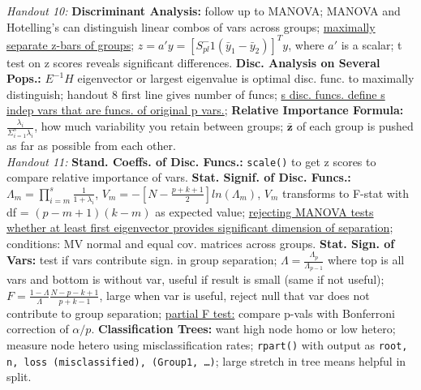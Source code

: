 \documentclass[9pt]{extarticle}
\begin{document}
\textit{Handout 10:}
\textbf{Discriminant Analysis:} follow up to MANOVA; MANOVA and Hotelling's can
distinguish linear combos of vars across groups; \underline{maximally separate 
z-bars of groups}; $z = a'y = [S_{pl}^-1(\bar{y}_1 - \bar{y}_2)]^T y$, where 
$a'$ is a scalar; t test on z scores reveals significant differences.
\textbf{Disc. Analysis on Several Pops.:} $E^{-1}H$ eigenvector or largest 
eigenvalue is optimal disc. func. to maximally distinguish; handout 8 first line 
gives number of funcs; \underline{s disc. funcs. define s indep vars that are 
funcs. of original p vars.}; \textbf{Relative Importance Formula:} $\frac{
\lambda_i}{\Sigma_{i=1}^s \lambda_i}$, how much variability you retain between
groups; $\boldsymbol{\bar{z}}$ of each group is pushed as far as possible from 
each other.\\

\textit{Handout 11:}
\textbf{Stand. Coeffs. of Disc. Funcs.:} \texttt{scale()} to get z scores to 
compare relative importance of vars.
\textbf{Stat. Signif. of Disc. Funcs.:} $\Lambda_m = \prod_{i=m}^s \frac{
1}{1 + \lambda_i}$, $V_m = -[N - \frac{p + k + 1}{2}]ln(\Lambda_m)$, $V_m$ 
transforms to F-stat with df = $(p-m+1)(k-m)$ as expected value; \underline{
rejecting MANOVA tests whether at least first eigenvector provides significant
dimension of separation}; conditions: MV normal and equal cov. matrices across 
groups.
\textbf{Stat. Sign. of Vars:} test if vars contribute sign. in group separation; 
$\Lambda = \frac{\Lambda_p}{\Lambda_{p-1}}$ where top is all vars and bottom is 
without var, useful if result is small (same if not useful); $F = \frac{1 - 
\Lambda}{\Lambda} \frac{N - p - k + 1}{p + k - 1}$, large when var is useful, 
reject null that var does not contribute to group separation; \underline{partial 
F test:} compare p-vals with Bonferroni correction of $\alpha / p$.
\textbf{Classification Trees:} want high node homo or low hetero; measure 
node hetero using misclassification rates; \texttt{rpart()} with output as 
\texttt{root, n, loss (misclassified), (Group1, \dots)}; large stretch in tree 
means helpful in split.\\
\end{document}
